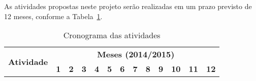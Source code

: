 As atividades propostas neste projeto serão realizadas em um prazo previsto de
12 meses, conforme a Tabela~\ref{tab:cronograma}.

\begin{table}[h!]
	\center
	\begin{tabular}[ht!]{| c | c | c | c | c | c | c | c | c | c | c | c | c |} \hline
    	\multirow{2}{*}{\textbf{Atividade}} & \multicolumn{12}{|c|}{\textbf{Meses (2014/2015)}} \\
        \cline{2-13}
     	& \textbf{1\bo} & \textbf{2\bo} & \textbf{3\bo} & \textbf{4\bo} & \textbf{5\bo} & \textbf{6\bo} &  \textbf{7\bo} & \textbf{8\bo} & \textbf{9\bo} & \textbf{10\bo} & \textbf{11\bo} & \textbf{12\bo} \\
        \hline
	
	\end{tabular}
        \caption{Cronograma das atividades}
	\label{tab:cronograma}
\end{table}

